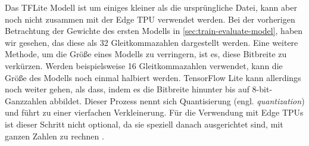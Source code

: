 Das TFLite Modell ist um einiges kleiner als die ursprüngliche Datei,
kann aber noch nicht zusammen mit der Edge TPU verwendet werden.
Bei der vorherigen Betrachtung der Gewichte des ersten Modells
in \autoref{sec:train-evaluate-model}, haben wir gesehen, das
diese als \qty{32}{\bit} Gleitkommazahlen dargestellt werden.
Eine weitere Methode, um die Größe eines Modells zu verringern,
ist es, diese Bitbreite zu verkürzen.
Werden beispielsweise \qty{16}{\bit} Gleitkommazahlen verwendet,
kann die Größe des Modells noch einmal halbiert werden.
TensorFlow Lite kann allerdings noch weiter gehen, als dass, indem es die
Bitbreite hinunter bis auf 8-bit-Ganzzahlen abbildet.
Dieser Prozess nennt sich Quantisierung
(engl. \textit{quantization}) und führt zu einer vierfachen Verkleinerung.
Für die Verwendung mit Edge TPUs ist dieser Schritt nicht optional,
da sie speziell danach ausgerichtet sind,
mit ganzen Zahlen zu rechnen \parencite{online:models-on-edge-tpu}.